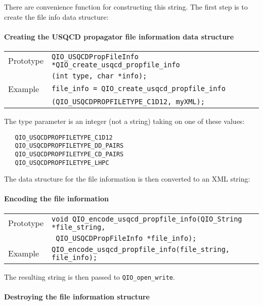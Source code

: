 \documentclass{article}
\begin{document}
There are convenience function for constructing this string.
The first step is to create the file info data structure:

\paragraph{Creating the USQCD propagator file information data structure}
%
\begin{flushleft}
  \begin{tabular}{|l|l|}
  \hline
  Prototype      & \verb|QIO_USQCDPropFileInfo *QIO_create_usqcd_propfile_info|\\
                 & \verb|(int type, char *info);|\\
\hline
  Example  & \verb|file_info = QIO_create_usqcd_propfile_info |\\
           & \verb|(QIO_USQCDPROPFILETYPE_C1D12, myXML);|\\
   \hline
 \end{tabular}
\end{flushleft}
%
The type parameter is an integer (not a string) taking on one of these
values:
%
\begin{verbatim}
   QIO_USQCDPROPFILETYPE_C1D12   
   QIO_USQCDPROPFILETYPE_DD_PAIRS
   QIO_USQCDPROPFILETYPE_CD_PAIRS
   QIO_USQCDPROPFILETYPE_LHPC    
\end{verbatim}
%

The data structure for the file information is then converted to an
XML string:

\paragraph{Encoding the file information}

%
\begin{flushleft}
  \begin{tabular}{|l|l|}
  \hline
  Prototype      & \verb|void QIO_encode_usqcd_propfile_info(QIO_String *file_string,|\\
                 & \verb| QIO_USQCDPropFileInfo *file_info);|\\
\hline
  Example  & \verb|QIO_encode_usqcd_propfile_info(file_string, file_info);|\\
   \hline
 \end{tabular}
\end{flushleft}
%

The resulting string is then passed to \verb|QIO_open_write|.

%
\paragraph{Destroying the file information structure}
\end{document}
